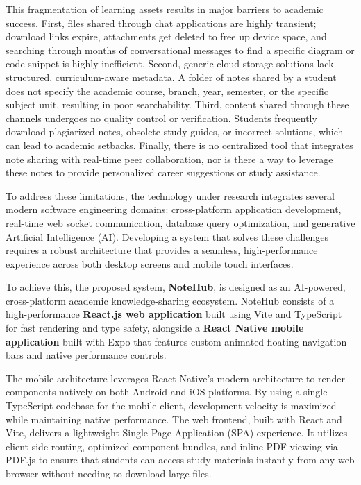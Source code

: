 \documentclass[12,Times new Roman,a4paper]{report}
\begin{document}
This fragmentation of learning assets results in major barriers to academic success. First, files shared through chat applications are highly transient; download links expire, attachments get deleted to free up device space, and searching through months of conversational messages to find a specific diagram or code snippet is highly inefficient. Second, generic cloud storage solutions lack structured, curriculum-aware metadata. A folder of notes shared by a student does not specify the academic course, branch, year, semester, or the specific subject unit, resulting in poor searchability. Third, content shared through these channels undergoes no quality control or verification. Students frequently download plagiarized notes, obsolete study guides, or incorrect solutions, which can lead to academic setbacks. Finally, there is no centralized tool that integrates note sharing with real-time peer collaboration, nor is there a way to leverage these notes to provide personalized career suggestions or study assistance.

To address these limitations, the technology under research integrates several modern software engineering domains: cross-platform application development, real-time web socket communication, database query optimization, and generative Artificial Intelligence (AI). Developing a system that solves these challenges requires a robust architecture that provides a seamless, high-performance experience across both desktop screens and mobile touch interfaces.

To achieve this, the proposed system, \textbf{NoteHub}, is designed as an AI-powered, cross-platform academic knowledge-sharing ecosystem. NoteHub consists of a high-performance \textbf{React.js web application} built using Vite and TypeScript for fast rendering and type safety, alongside a \textbf{React Native mobile application} built with Expo that features custom animated floating navigation bars and native performance controls. 

The mobile architecture leverages React Native's modern architecture to render components natively on both Android and iOS platforms. By using a single TypeScript codebase for the mobile client, development velocity is maximized while maintaining native performance. The web frontend, built with React and Vite, delivers a lightweight Single Page Application (SPA) experience. It utilizes client-side routing, optimized component bundles, and inline PDF viewing via PDF.js to ensure that students can access study materials instantly from any web browser without needing to download large files.
\end{document}
